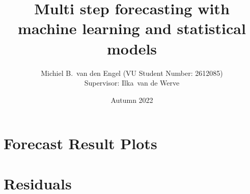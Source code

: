 \documentclass[hidelinks, a4paper,12pt]{article}
\title{Multi step forecasting with machine learning and statistical models}
\author{
    Michiel B.\ van den Engel
    (VU Student Number: 2612085)
    \\[2ex]
    Supervisor: Ilka\ van de Werve\\
    }
\date{Autumn 2022}
\begin{document}

\tableofcontents
\newpage








\newpage
\appendix

\section{Forecast Result Plots}
\label{sec:forecast results}
%
\section{Residuals}
\label{sec:residuals}
%

\newpage


\end{document}
